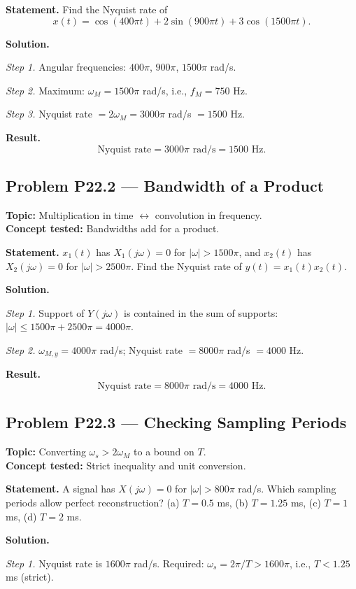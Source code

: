 \documentclass[11pt]{article}
\begin{document}
\textbf{Statement.} Find the Nyquist rate of
\[
x(t) = \cos(400\pi t) + 2\sin(900\pi t) + 3\cos(1500\pi t).
\]

\textbf{Solution.}

\textit{Step 1.} Angular frequencies: $400\pi$, $900\pi$, $1500\pi$ rad/s.

\textit{Step 2.} Maximum: $\omega_{M} = 1500\pi$ rad/s, i.e., $f_{M}=750$ Hz.

\textit{Step 3.} Nyquist rate $= 2\omega_{M} = 3000\pi$ rad/s $= 1500$ Hz.

\textbf{Result.}
\[
\boxed{\,\text{Nyquist rate} = 3000\pi\text{ rad/s} = 1500\text{ Hz}.\,}
\]

\subsection{Problem P22.2 --- Bandwidth of a Product}
\textbf{Topic:} Multiplication in time $\leftrightarrow$ convolution in frequency.\\
\textbf{Concept tested:} Bandwidths add for a product.

\textbf{Statement.} $x_{1}(t)$ has $X_{1}(j\omega) = 0$ for $|\omega|>1500\pi$,
and $x_{2}(t)$ has $X_{2}(j\omega) = 0$ for $|\omega|>2500\pi$. Find the
Nyquist rate of $y(t) = x_{1}(t)x_{2}(t)$.

\textbf{Solution.}

\textit{Step 1.} Support of $Y(j\omega)$ is contained in the sum of supports:
$|\omega|\le 1500\pi+2500\pi = 4000\pi$.

\textit{Step 2.} $\omega_{M,y} = 4000\pi$ rad/s; Nyquist rate $= 8000\pi$ rad/s $= 4000$ Hz.

\textbf{Result.}
\[
\boxed{\,\text{Nyquist rate} = 8000\pi\text{ rad/s} = 4000\text{ Hz}.\,}
\]

\subsection{Problem P22.3 --- Checking Sampling Periods}
\textbf{Topic:} Converting $\omega_{s}>2\omega_{M}$ to a bound on $T$.\\
\textbf{Concept tested:} Strict inequality and unit conversion.

\textbf{Statement.} A signal has $X(j\omega)=0$ for $|\omega|>800\pi$ rad/s.
Which sampling periods allow perfect reconstruction?
(a) $T=0.5$ ms, (b) $T=1.25$ ms, (c) $T=1$ ms, (d) $T=2$ ms.

\textbf{Solution.}

\textit{Step 1.} Nyquist rate is $1600\pi$ rad/s. Required:
$\omega_{s} = 2\pi/T > 1600\pi$, i.e., $T < 1.25$ ms (strict).
\end{document}
